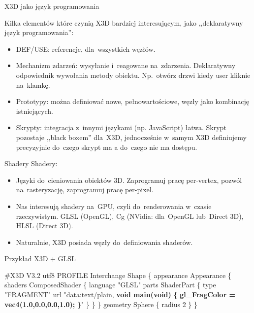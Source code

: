 \documentclass{beamer}
\begin{document}
\begin{frame}{X3D jako język programowania}

Kilka elementów które czynią X3D bardziej interesującym,
jako ,,deklaratywny język programowania'':

\begin{itemize}
  \item DEF/USE: referencje, dla~wszystkich węzłów.
  \item Mechanizm zdarzeń: wysyłanie i~reagowane na~zdarzenia.
    Deklaratywny odpowiednik wywołania metody obiektu.
    Np.~otwórz drzwi kiedy user kliknie na~klamkę.
  \item Prototypy: można definiować nowe, pełnowartościowe,
    węzły jako kombinację istniejących.
  \item Skrypty: integracja z~innymi językami (np. JavaScript) łatwa.
    Skrypt pozostaje ,,black boxem'' dla~X3D, jednocześnie w~samym
    X3D definiujemy precyzyjnie do~czego skrypt ma a do~czego nie ma dostępu.
\end{itemize}
\end{frame}

\begin{frame}{Shadery}
Shadery:
\begin{itemize}
  \item Języki do~cieniowania obiektów 3D. Zaprogramuj pracę per-vertex,
    pozwól na~rasteryzację, zaprogramuj pracę per-pixel.
  \item Nas interesują shadery na~GPU, czyli do~renderowania w~czasie
    rzeczywistym. GLSL (OpenGL), Cg (NVidia: dla~OpenGL lub~Direct 3D),
    HLSL (Direct 3D).
  \item Naturalnie, X3D posiada węzły do~definiowania shaderów.
\end{itemize}
\end{frame}

\begin{frame}[fragile]
\begin{exampleblock}{Przykład X3D + GLSL}
\begin{semiverbatim}
\#X3D V3.2 utf8
PROFILE Interchange
Shape \{
  appearance Appearance \{
    shaders ComposedShader \{
      language "GLSL"
      parts ShaderPart \{
        type "FRAGMENT"
        url "data:text/plain,
        \textbf{void main(void)}
        \textbf{\{}
          \textbf{gl\_FragColor = vec4(1.0,0.0,0.0,1.0);}
        \textbf{\}}" \} \} \}
  geometry Sphere \{ radius 2 \}
\}
\end{semiverbatim}
\end{exampleblock}
\end{frame}
\end{document}
